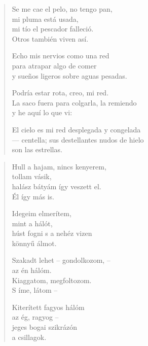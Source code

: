 \documentclass[11pt]{extbook}
\newcommand*{\centeredornament}{\centerline{\pgfornament[width=6cm]{88}}}
\begin{document}

\vspace*{-15mm}
\centeredornament



\begin{verse}
  Se me cae el pelo, no tengo pan, \\
  mi pluma está usada, \\
  mi tío el pescador falleció. \\
  Otros también viven así.

  Echo mis nervios como una red \\
  para atrapar algo de comer \\
  y sueños ligeros sobre aguas pesadas.

  Podría estar rota, creo, mi red. \\
  La saco fuera para colgarla, la remiendo \\
  y he aquí lo que vi:

  El cielo es mi red desplegada y congelada \\
  --- centella; sus destellantes nudos de hielo \\
  son las estrellas.
\end{verse}

\newpage

\vspace*{-15mm}
\centeredornament



\begin{verse}
  Hull a hajam, nincs kenyerem, \\
  tollam vásik, \\
  halász bátyám így veszett el. \\
  Él így más is.

  Idegeim elmerítem, \\
  mint a hálót, \\
  húst fogni s a nehéz vizen \\
  könnyű álmot.

  Szakadt lehet -- gondolkozom, -- \\
  az én hálóm. \\
  Kiaggatom, megfoltozom. \\
  S íme, látom --

  Kiterített fagyos hálóm \\
  az ég, ragyog -- \\
  jeges bogai szikrázón \\
  a csillagok.
\end{verse}
\end{document}
